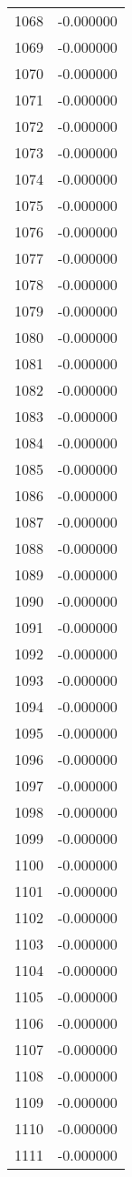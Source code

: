 \documentclass[12pt]{article}
\begin{document}
\begin{longtable}{@{}cc@{}}
1068 & -0.000000 \\
1069 & -0.000000 \\
1070 & -0.000000 \\
1071 & -0.000000 \\
1072 & -0.000000 \\
1073 & -0.000000 \\
1074 & -0.000000 \\
1075 & -0.000000 \\
1076 & -0.000000 \\
1077 & -0.000000 \\
1078 & -0.000000 \\
1079 & -0.000000 \\
1080 & -0.000000 \\
1081 & -0.000000 \\
1082 & -0.000000 \\
1083 & -0.000000 \\
1084 & -0.000000 \\
1085 & -0.000000 \\
1086 & -0.000000 \\
1087 & -0.000000 \\
1088 & -0.000000 \\
1089 & -0.000000 \\
1090 & -0.000000 \\
1091 & -0.000000 \\
1092 & -0.000000 \\
1093 & -0.000000 \\
1094 & -0.000000 \\
1095 & -0.000000 \\
1096 & -0.000000 \\
1097 & -0.000000 \\
1098 & -0.000000 \\
1099 & -0.000000 \\
1100 & -0.000000 \\
1101 & -0.000000 \\
1102 & -0.000000 \\
1103 & -0.000000 \\
1104 & -0.000000 \\
1105 & -0.000000 \\
1106 & -0.000000 \\
1107 & -0.000000 \\
1108 & -0.000000 \\
1109 & -0.000000 \\
1110 & -0.000000 \\
1111 & -0.000000 \\

\end{longtable}
\end{document}
